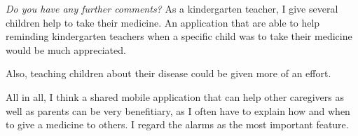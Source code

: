 \emph{Do you have any further comments?}
As a kindergarten teacher, I give several children help to take their medicine. An application that are able to help reminding kindergarten teachers when a specific child was to take their medicine would be much appreciated. 

Also, teaching children about their disease could be given more of an effort.

All in all, I think a shared mobile application that can help other caregivers as well as parents can be very benefitiary, as I often have to explain how and when to give a medicine to others. I regard the alarms as the most important feature.  
   
